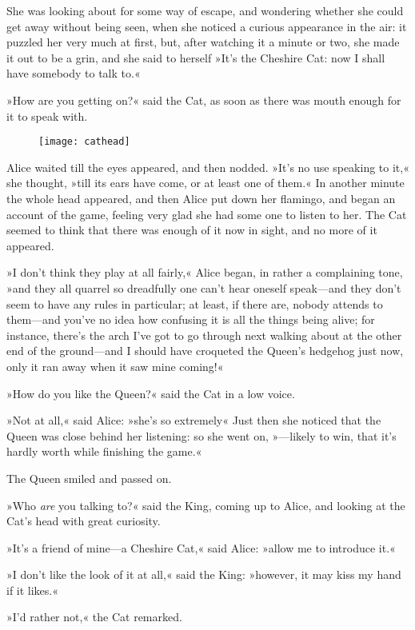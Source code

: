 She was looking about for some way of escape, and wondering whether she could get away without being seen, when she noticed a curious appearance in the air: it puzzled her very much at first, but, after watching it a minute or two, she made it out to be a grin, and she said to herself »It's the Cheshire Cat: now I shall have somebody to talk to.«

»How are you getting on?« said the Cat, as soon as there was mouth enough for it to speak with.

\begin{figure}[tbh]
\centering
\texttt{[image: cathead]}
\end{figure}


Alice waited till the eyes appeared, and then nodded. »It's no use speaking to it,« she thought, »till its ears have come, or at least one of them.« In another minute the whole head appeared, and then Alice put down her flamingo, and began an account of the game, feeling very glad she had some one to listen to her. The Cat seemed to think that there was enough of it now in sight, and no more of it appeared.

»I don't think they play at all fairly,« Alice began, in rather a complaining tone, »and they all quarrel so dreadfully one can't hear oneself speak—and they don't seem to have any rules in particular; at least, if there are, nobody attends to them—and you've no idea how confusing it is all the things being alive; for instance, there's the arch I've got to go through next walking about at the other end of the ground—and I should have croqueted the Queen's hedgehog just now, only it ran away when it saw mine coming!«

»How do you like the Queen?« said the Cat in a low voice.

»Not at all,« said Alice: »she's so extremely\longdash« Just then she noticed that the Queen was close behind her listening: so she went on, »—likely to win, that it's hardly worth while finishing the game.«

The Queen smiled and passed on.

»Who \textit{are} you talking to?« said the King, coming up to Alice, and looking at the Cat's head with great curiosity.

»It's a friend of mine—a Cheshire Cat,« said Alice: »allow me to introduce it.«

»I don't like the look of it at all,« said the King: »however, it may kiss my hand if it likes.«

»I'd rather not,« the Cat remarked.

